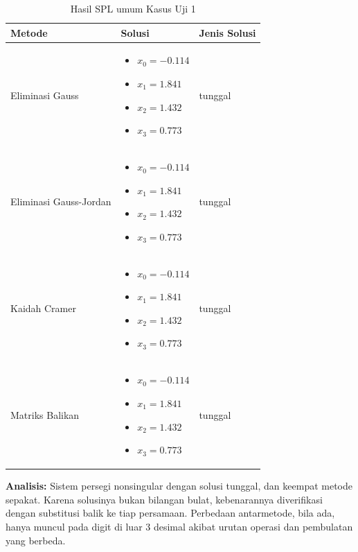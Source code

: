 \documentclass[12pt,a4paper]{report}
\begin{document}
\begin{table}[H]
    \centering
    \caption{Hasil SPL umum Kasus Uji 1}
    \begin{tabular}{|l|p{5cm}|l|}
        \hline
        \textbf{Metode} & \textbf{Solusi} & \textbf{Jenis Solusi} \\
        \hline
        Eliminasi Gauss & 
        \begin{itemize}
            \item $x_0 = -0.114$
            \item $x_1 = 1.841$
            \item $x_2 = 1.432$
            \item $x_3 = 0.773$
        \end{itemize}
        & tunggal \\
        \hline
        Eliminasi Gauss-Jordan & 
        \begin{itemize}
            \item $x_0 = -0.114$
            \item $x_1 = 1.841$
            \item $x_2 = 1.432$
            \item $x_3 = 0.773$
        \end{itemize}
        & tunggal \\
        \hline
        Kaidah Cramer & 
        \begin{itemize}
            \item $x_0 = -0.114$
            \item $x_1 = 1.841$
            \item $x_2 = 1.432$
            \item $x_3 = 0.773$
        \end{itemize}
        & tunggal \\
        \hline
        Matriks Balikan & 
        \begin{itemize}
            \item $x_0 = -0.114$
            \item $x_1 = 1.841$
            \item $x_2 = 1.432$
            \item $x_3 = 0.773$
        \end{itemize}
        & tunggal \\
        \hline
    \end{tabular}
\end{table}

\textbf{Analisis:} Sistem persegi nonsingular dengan solusi tunggal, dan keempat metode sepakat. Karena solusinya bukan bilangan bulat, kebenarannya diverifikasi dengan substitusi balik ke tiap persamaan. Perbedaan antarmetode, bila ada, hanya muncul pada digit di luar 3 desimal akibat urutan operasi dan pembulatan yang berbeda.
\end{document}

